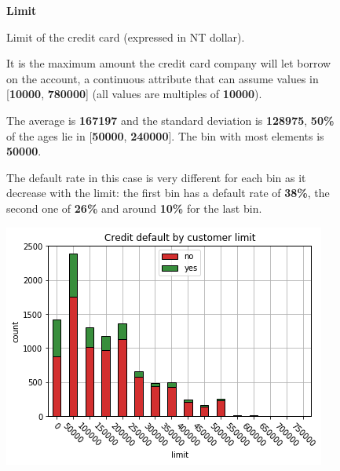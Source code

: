 \begin{figure}[h]
  \begin{minipage}[h]{.50\textwidth}
        {\Large \textbf{Limit}}
        
        Limit of the credit card (expressed in NT dollar).
        
        It is the maximum amount the credit card company will let borrow on the account, 
        a continuous attribute that can assume values in [\textbf{10000}, \textbf{780000}] (all values are multiples of \textbf{10000}).
        
        The average is \textbf{167197} and the standard deviation is \textbf{128975}, \textbf{50\%} of the ages lie in [\textbf{50000}, \textbf{240000}]. The bin with most elements is \textbf{50000}.
        
        The default rate in this case is very different for each bin as it decrease with the limit: the first bin has a default rate of \textbf{38\%}, the second one of \textbf{26\%} and around \textbf{10\%} for the last bin.
        
  \end{minipage}
  \begin{minipage}[h]{.50\textwidth}
    \includegraphics[width=.95\textwidth]{img/ch2/limit}
  \end{minipage}

\end{figure}


